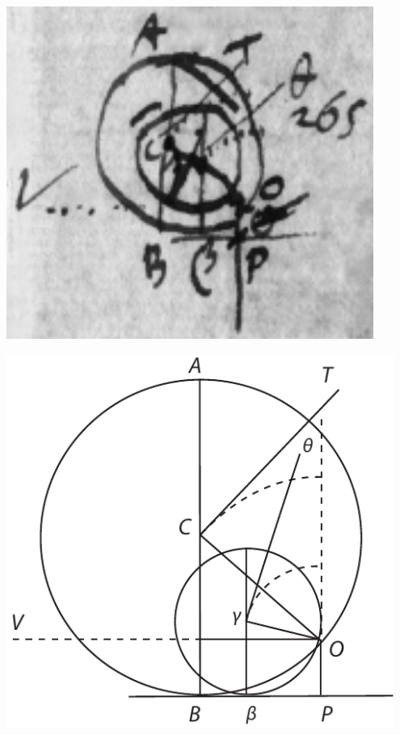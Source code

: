 \begin{minipage}[c]{0.45\textwidth}
\hspace*{-10mm}
\includegraphics[width=0.9\textwidth]{images/LH035,14,02_120r-Ausschnitt.pdf}%
\end{minipage}
\hspace*{-2mm}
\begin{minipage}[c]{0.55\textwidth}
\includegraphics[width=0.95\textwidth]{images/LH035,14,02_120r-d2.pdf}%
\vspace{0.5em}
\end{minipage}
